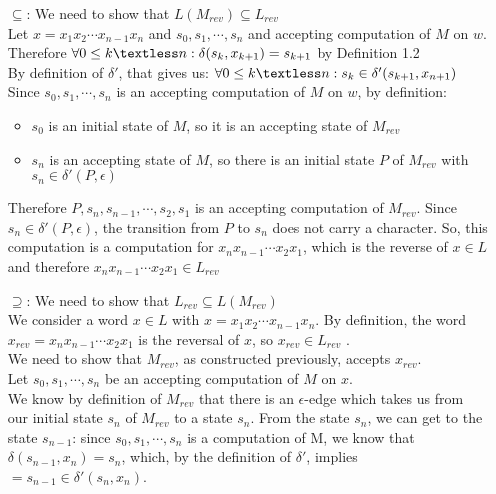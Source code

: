 \begin{itemize}
    \item[$\subseteq$:] We need to show that $L(M_{rev})\subseteq L_{rev}$\\
    Let $x=x_{1}x_{2}\cdots x_{n-1}x_{n}$ and $s_{0},s_{1},\cdots,s_{n}$ and accepting computation of $M$ on $w$.\\
    Therefore $\forall 0 \leq k \textless n: \delta(s_{k},x_{k+1})=s_{k+1}$  by Definition 1.2\\
    By definition of $\delta'$, that gives us: $\forall 0 \leq k \textless n: s_{k} \in \delta'(s_{k+1}, x_{n+1})$\\
    Since $s_{0},s_{1},\cdots,s_{n}$ is an accepting computation of $M$ on $w$, by definition:
    \begin{itemize}
        \item $s_{0}$ is an initial state of $M$, so it is an accepting state of $M_{rev}$
        \item $s_{n}$ is an accepting state of $M$, so there is an initial state $P$ of $M_{rev}$ with $s_{n} \in \delta'(P,\epsilon)$
    \end{itemize}
    Therefore $P,s_{n},s_{n-1},\cdots, s_{2},s_{1}$ is an accepting computation of $M_{rev}$. Since $s_{n} \in \delta'(P,\epsilon)$, the transition from $P$ to $s_{n}$ does not carry a character. So, this computation is a computation for $x_{n}x_{n-1}\cdots x_{2}x_{1}$, which is the reverse of $x \in L$ and therefore $x_{n}x_{n-1}\cdots x_{2}x_{1} \in L_{rev}$
    \item[$\supseteq$:] We need to show that $L_{rev}\subseteq L(M_{rev})$\\
    We consider a word $x \in L$ with $x=x_{1}x_{2}\cdots x_{n-1}x_{n}$. By definition, the word $x_{rev} = x_{n}x_{n-1}\cdots x_{2}x_{1}$ is the reversal of $x$, so $x_{rev} \in L_{rev}$ .\\
    We need to show that $M_{rev}$, as constructed previously, accepts $x_{rev}$.\\
    Let $s_{0}, s_{1},\cdots,s_{n}$ be an accepting computation of $M$ on $x$.\\
    We know by definition of $M_{rev}$ that there is an $\epsilon$-edge which takes us from our initial state $s_{n}$ of $M_{rev}$ to a state $s_{n}$. From the state $s_{n}$, we can get to the state $s_{n-1}$: since $s_{0}, s_{1}, \cdots, s_{n}$ is a computation of M, we know that $\delta(s_{n-1}, x_{n})=s_{n}$, which, by the definition of $\delta'$, implies $=s_{n-1} \in \delta'(s_{n},x_{n})$.\\

\end{itemize}

